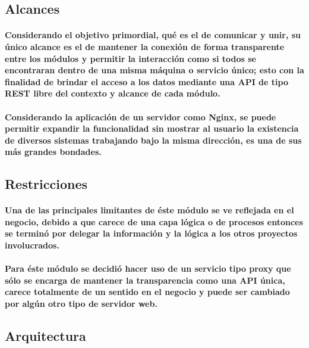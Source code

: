   \subsection{Alcances}
    \paragraph{Considerando el objetivo primordial, qué es el de comunicar y unir, su único alcance es el de mantener la conexión de forma transparente entre los módulos y permitir la interacción como si todos se encontraran dentro de una misma máquina o servicio único; esto con la finalidad de brindar el acceso a los datos mediante una API de tipo REST libre del contexto y alcance de cada módulo.}
    \paragraph{Considerando la aplicación de un servidor como Nginx, se puede permitir expandir la funcionalidad sin mostrar al usuario la existencia de diversos sistemas trabajando bajo la misma dirección, es una de sus más grandes bondades.}
  \subsection{Restricciones}
    \paragraph{Una de las principales limitantes de éste módulo se ve reflejada en el negocio, debido a que carece de una capa lógica o de procesos entonces se terminó por delegar la información y la lógica a los otros proyectos involucrados.}
    \paragraph{Para éste módulo se decidió hacer uso de un servicio tipo proxy que sólo se encarga de mantener la transparencia como una API única, carece totalmente de un sentido en el negocio y puede ser cambiado por algún otro tipo de servidor web.}
  \subsection{Arquitectura}
